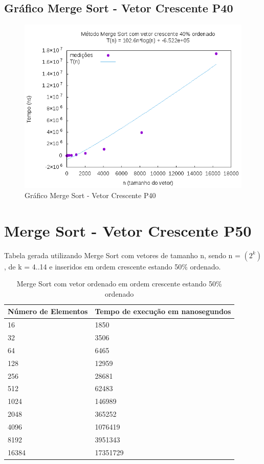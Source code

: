 \documentclass[12pt,a4paper,twoside]{report}
\begin{document}
\subsection{Gráfico Merge Sort - Vetor Crescente P40}
\begin{figure}[H]
    \centering
    \includegraphics[width=0.7\linewidth]{graficos/MergeSort/vIntCrescenteP40/vIntCrescenteP40.png}
  \caption{Gráfico Merge Sort - Vetor Crescente P40}
\end{figure}

\section{Merge Sort - Vetor Crescente P50}
Tabela gerada utilizando Merge Sort com vetores de tamanho n, sendo n = $(2^k)$, de k = 4..14 e inseridos em ordem crescente estando 50\% ordenado.
\begin{table}[H]
\centering
\caption{Merge Sort com vetor ordenado em ordem crescente estando 50\% ordenado}
\label{my-label}
\begin{tabular}{|l|l|}
\hline
\multicolumn{1}{|c|}{\textbf{Número de Elementos}} & \multicolumn{1}{c|}{\textbf{Tempo de execução em nanosegundos}} \\ \hline
16 & 1850 \\ \hline
32 & 3506 \\ \hline
64 & 6465 \\ \hline
128 & 12959 \\ \hline
256 & 28681 \\ \hline
512 & 62483 \\ \hline
1024 & 146989 \\ \hline
2048 & 365252 \\ \hline
4096 & 1076419 \\ \hline
8192 & 3951343 \\ \hline
16384 & 17351729 \\ \hline
\end{tabular}
\end{table}
\end{document}
